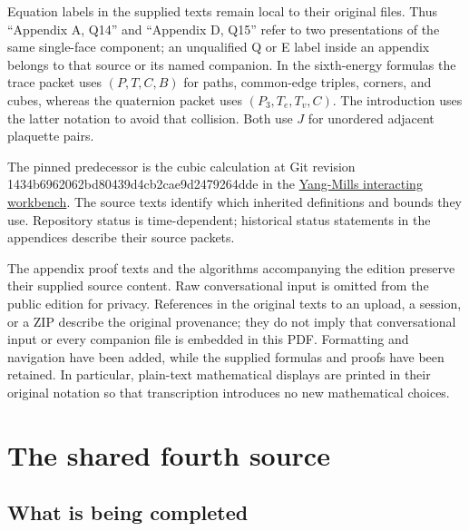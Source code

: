 \documentclass[11pt,a4paper]{article}
\let\originalsection\section
\renewcommand{\section}{\clearpage\originalsection}
\renewcommand{\[}{\begingroup\small\originaldisplaystart}
\renewcommand{\]}{\originaldisplayend\endgroup}
\begin{document}
Equation labels in the supplied texts remain local to their original
files. Thus ``Appendix A, Q14'' and ``Appendix D, Q15'' refer to two
presentations of the same single-face component; an unqualified Q or E
label inside an appendix belongs to that source or its named companion.
In the sixth-energy formulas the trace packet uses \((P,T,C,B)\) for
paths, common-edge triples, corners, and cubes, whereas the quaternion
packet uses \((P_3,T_e,T_v,C)\). The introduction uses the latter
notation to avoid that collision. Both use \(J\) for unordered adjacent
plaquette pairs.

The pinned predecessor is the cubic calculation at Git revision
{\allowbreak{}1\allowbreak{}4\allowbreak{}3\allowbreak{}4\allowbreak{}b\allowbreak{}6\allowbreak{}9\allowbreak{}6\allowbreak{}2\allowbreak{}0\allowbreak{}6\allowbreak{}2\allowbreak{}b\allowbreak{}d\allowbreak{}8\allowbreak{}0\allowbreak{}4\allowbreak{}3\allowbreak{}9\allowbreak{}d\allowbreak{}4\allowbreak{}c\allowbreak{}b\allowbreak{}2\allowbreak{}c\allowbreak{}a\allowbreak{}e\allowbreak{}9\allowbreak{}d\allowbreak{}2\allowbreak{}4\allowbreak{}7\allowbreak{}9\allowbreak{}2\allowbreak{}6\allowbreak{}4\allowbreak{}d\allowbreak{}d\allowbreak{}e\allowbreak{}}
in the
\href{https://github.com/KokunoYumeto/yang-mills-interacting-workbench}{Yang-Mills
interacting workbench}. The source texts identify which inherited
definitions and bounds they use. Repository status is time-dependent;
historical status statements in the appendices describe their source
packets.

The appendix proof texts and the algorithms accompanying the edition
preserve their supplied source content. Raw conversational input is
omitted from the public edition for privacy. References in the original
texts to an upload, a session, or a ZIP describe the original
provenance; they do not imply that conversational input or every
companion file is embedded in this PDF. Formatting and navigation have
been added, while the supplied formulas and proofs have been retained.
In particular, plain-text mathematical displays are printed in their
original notation so that transcription introduces no new mathematical
choices.

\section{The shared fourth source}\label{the-shared-fourth-source}

\subsection{What is being completed}\label{what-is-being-completed}
\end{document}
